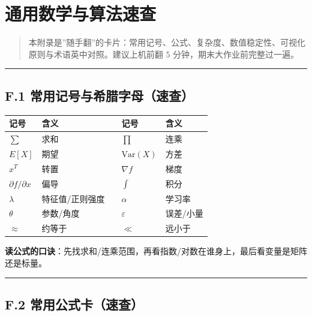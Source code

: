 \chapter{通用数学与算法速查}\label{ux901aux7528ux6570ux5b66ux4e0eux7b97ux6cd5ux901fux67e5}

\begin{quote}
本附录是''随手翻''的卡片：常用记号、公式、复杂度、数值稳定性、可视化原则与术语英中对照。建议上机前翻
5 分钟，期末大作业前完整过一遍。
\end{quote}

\begin{center}\rule{0.5\linewidth}{0.5pt}\end{center}

\section{F.1
常用记号与希腊字母（速查）}\label{f.1-ux5e38ux7528ux8bb0ux53f7ux4e0eux5e0cux814aux5b57ux6bcdux901fux67e5}

{\def\LTcaptype{none} %
\begin{longtable}[]{@{}lllll@{}}
\toprule\noalign{}
记号 & 含义 & & 记号 & 含义 \\
\midrule\noalign{}
\endhead
\bottomrule\noalign{}
\endlastfoot
\(\sum\) & 求和 & & \(\prod\) & 连乘 \\
\(E[X]\) & 期望 & & \(\mathrm{Var}(X)\) & 方差 \\
\(x^T\) & 转置 & & \(\nabla f\) & 梯度 \\
\(\partial f/\partial x\) & 偏导 & & \(\int\) & 积分 \\
\(\lambda\) & 特征值/正则强度 & & \(\alpha\) & 学习率 \\
\(\theta\) & 参数/角度 & & \(\varepsilon\) & 误差/小量 \\
\(\approx\) & 约等于 & & \(\ll\) & 远小于 \\
\end{longtable}
}

\textbf{读公式的口诀}：先找求和/连乘范围，再看指数/对数在谁身上，最后看变量是矩阵还是标量。

\begin{center}\rule{0.5\linewidth}{0.5pt}\end{center}

\section{F.2
常用公式卡（速查）}\label{f.2-ux5e38ux7528ux516cux5f0fux5361ux901fux67e5}


